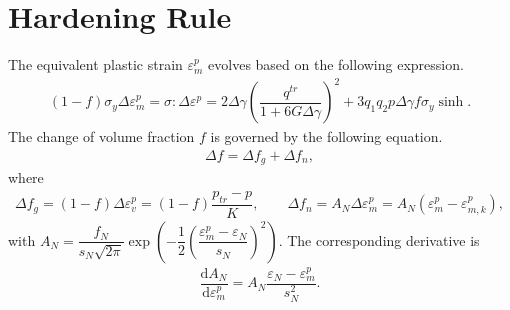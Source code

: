 \documentclass[10pt,fleqn,3p]{elsarticle}
\newcommand*{\md}[1]{\mathrm{d}#1}
\newcommand*{\ddfrac}[2]{\dfrac{\md#1}{\md#2}}
\begin{document}
\section{Hardening Rule}
The equivalent plastic strain $\varepsilon^p_m$ evolves based on the following expression.
\begin{gather*}
\left(1-f\right)\sigma_y\Delta\varepsilon^p_m=\sigma:\Delta\varepsilon^p=2\Delta\gamma\left(\dfrac{q^{tr}}{1+6G\Delta\gamma}\right)^2+3q_1q_2p\Delta\gamma{}f\sigma_y\sinh.
\end{gather*}
The change of volume fraction $f$ is governed by the following equation.
\begin{gather*}
\Delta{}f=\Delta{}f_g+\Delta{}f_n,
\end{gather*}
where
\begin{gather*}
\Delta{}f_g=\left(1-f\right)\Delta\varepsilon^p_v=\left(1-f\right)\dfrac{p_{tr}-p}{K},\qquad
\Delta{}f_n=A_N\Delta\varepsilon^p_m=A_N\left(\varepsilon^p_m-\varepsilon^p_{m,k}\right),
\end{gather*}
with $A_N=\dfrac{f_N}{s_N\sqrt{2\pi}}\exp\left(-\dfrac{1}{2}\left(\dfrac{\varepsilon^p_m-\varepsilon_N}{s_N}\right)^2\right)$. The corresponding derivative is
\begin{gather*}
\ddfrac{A_N}{\varepsilon^p_m}=A_N\dfrac{\varepsilon_N-\varepsilon^p_m}{s_N^2}.
\end{gather*}
\end{document}
